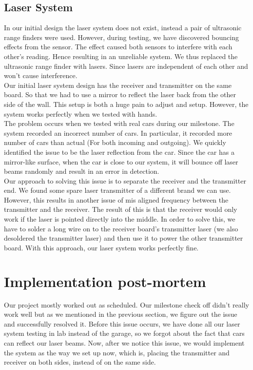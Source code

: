 \documentclass[12pt, a4paper]{article}
\begin{document}
\subsection{Laser System}
In our initial design the laser system does not exist, instead a pair of ultrasonic range finders were used. However, during testing, we have discovered bouncing effects from the sensor. The effect caused both sensors to interfere with each other's reading. Hence resulting in an unreliable system. We thus replaced the ultrasonic range finder with lasers. Since lasers are independent of each other and won't cause interference.
\\
Our initial laser system design has the receiver and transmitter on the same board. So that we had to use a mirror to reflect the laser back from the other side of the wall. This setup is both a huge pain to adjust and setup. However, the system works perfectly when we tested with hands. 
\\
The problem occurs when we tested with real cars during our milestone. The system recorded an incorrect number of cars. In particular, it recorded more number of cars than actual (For both incoming and outgoing). We quickly identified the issue to be the laser reflection from the car. Since the car has a mirror-like surface, when the car is close to our system, it will bounce off laser beams randomly and result in an error in detection. 
\\
Our approach to solving this issue is to separate the receiver and the transmitter end. We found some spare laser transmitter of a different brand we can use. However, this results in another issue of mis aligned frequency between the transmitter and the receiver. The result of this is that the receiver would only work if the laser is pointed directly into the middle. In order to solve this, we have to solder a long wire on to the receiver board's transmitter laser (we also desoldered the transmitter laser) and then use it to power the other transmitter board. With this approach, our laser system works perfectly fine.
\section{Implementation post-mortem}
Our project mostly worked out as scheduled. Our milestone check off didn’t really work well but as we mentioned in the previous section, we figure out the issue and successfully resolved it. Before this issue occurs, we have done all our laser system testing in lab instead of the garage, so we forgot about the fact that cars can reflect our laser beams. Now, after we notice this issue, we would implement the system as the way we set up now, which is, placing the transmitter and receiver on both sides, instead of on the same side.
\end{document}
